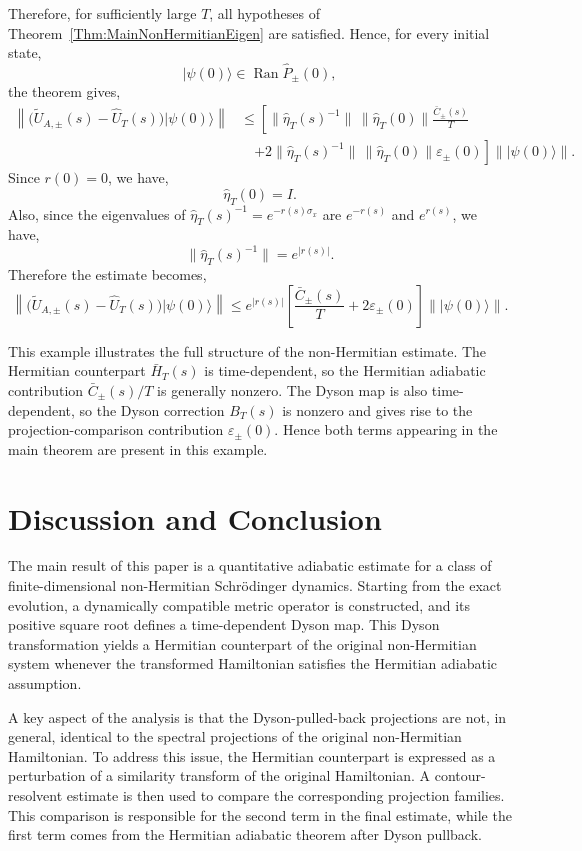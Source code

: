 \documentclass[pdflatex,sn-mathphys-num]{sn-jnl}
\theoremstyle{thmstyleone}
\theoremstyle{thmstyletwo}
\theoremstyle{thmstylethree}
\begin{document}
Therefore, for sufficiently large \(T\), all hypotheses of
Theorem~\ref{Thm:MainNonHermitianEigen} are satisfied. Hence, for every initial
state,
\[
|\psi(0)\rangle\in\operatorname{Ran}\hat P_{\pm}(0),
\]
the theorem gives,
\[
\begin{aligned}
\left\|
\bigl(\widetilde U_{A,\pm}(s)-\hat U_T(s)\bigr)|\psi(0)\rangle
\right\|
&\le
\left[
\|\hat\eta_T(s)^{-1}\|\,\|\hat\eta_T(0)\|
\frac{\bar C_{\pm}(s)}{T}
\right.\\
&\quad\left.
+
2\|\hat\eta_T(s)^{-1}\|\,\|\hat\eta_T(0)\|
\varepsilon_{\pm}(0)
\right]
\||\psi(0)\rangle\|.
\end{aligned}
\]
Since \(r(0)=0\), we have,
\[
\hat\eta_T(0)=I.
\]
Also, since the eigenvalues of \(\hat\eta_T(s)^{-1}=e^{-r(s)\sigma_x}\) are
\(e^{-r(s)}\) and \(e^{r(s)}\), we have,
\[
\|\hat\eta_T(s)^{-1}\|=e^{|r(s)|}.
\]
Therefore the estimate becomes,
\[
\left\|
\bigl(\widetilde U_{A,\pm}(s)-\hat U_T(s)\bigr)|\psi(0)\rangle
\right\|
\le
e^{|r(s)|}
\left[
\frac{\bar C_{\pm}(s)}{T}
+
2\varepsilon_{\pm}(0)
\right]
\||\psi(0)\rangle\|.
\]

This example illustrates the full structure of the non-Hermitian estimate. The
Hermitian counterpart \(\bar H_T(s)\) is time-dependent, so the Hermitian
adiabatic contribution \(\bar C_{\pm}(s)/T\) is generally nonzero. The Dyson map
is also time-dependent, so the Dyson correction \(B_T(s)\) is nonzero and gives
rise to the projection-comparison contribution \(\varepsilon_{\pm}(0)\). Hence
both terms appearing in the main theorem are present in this example.

\section{Discussion and Conclusion}

The main result of this paper is a quantitative adiabatic estimate for a class of
finite-dimensional non-Hermitian Schr\"odinger dynamics. Starting from the exact
evolution, a dynamically compatible metric operator is constructed, and its
positive square root defines a time-dependent Dyson map. This Dyson
transformation yields a Hermitian counterpart of the original non-Hermitian
system whenever the transformed Hamiltonian satisfies the Hermitian adiabatic
assumption.

A key aspect of the analysis is that the Dyson-pulled-back projections are not,
in general, identical to the spectral projections of the original non-Hermitian
Hamiltonian. To address this issue, the Hermitian counterpart is expressed as a
perturbation of a similarity transform of the original Hamiltonian. A contour-resolvent estimate is then used to compare the corresponding projection
families. This comparison is responsible for the second term in the final estimate, while
the first term comes from the Hermitian adiabatic theorem after Dyson pullback.
\end{document}
